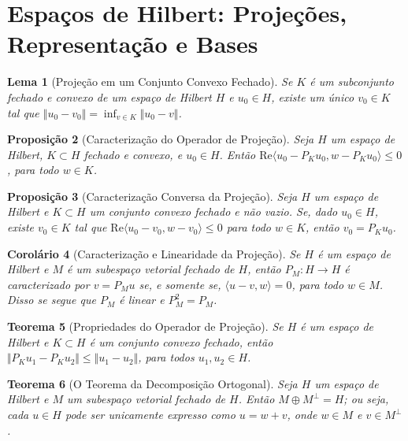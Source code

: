 \documentclass[12pt]{article}
\newtheorem{theorem}{Teorema}[section]
\newtheorem{proposition}[theorem]{Proposição}
\newtheorem{lemma}[theorem]{Lema}
\newtheorem{corollary}[theorem]{Corolário}
\begin{document}
\section{Espaços de Hilbert: Projeções, Representação e Bases}
\begin{multicols}{3}
\begin{lemma}[Projeção em um Conjunto Convexo Fechado]
Se $K$ é um subconjunto fechado e convexo de um espaço de Hilbert $H$ e $u_0 \in H$, existe um único $v_0 \in K$ tal que $\Vert u_0 - v_0 \Vert = \inf_{v \in K} \Vert u_0 - v \Vert$.
\end{lemma}

\begin{proposition}[Caracterização do Operador de Projeção]
Seja $H$ um espaço de Hilbert, $K \subset H$ fechado e convexo, e $u_0 \in H$. Então $\text{Re}\langle u_0 - P_K u_0, w - P_K u_0 \rangle \le 0$, para todo $w \in K$.
\end{proposition}

\begin{proposition}[Caracterização Conversa da Projeção]
Seja $H$ um espaço de Hilbert e $K \subset H$ um conjunto convexo fechado e não vazio. Se, dado $u_0 \in H$, existe $v_0 \in K$ tal que $\text{Re}\langle u_0 - v_0, w - v_0 \rangle \le 0$ para todo $w \in K$, então $v_0 = P_K u_0$.
\end{proposition}

\begin{corollary}[Caracterização e Linearidade da Projeção]
Se $H$ é um espaço de Hilbert e $M$ é um subespaço vetorial fechado de $H$, então $P_M: H \to H$ é caracterizado por $v = P_M u$ se, e somente se, $\langle u - v, w \rangle = 0$, para todo $w \in M$. Disso se segue que $P_M$ é linear e $P_M^2 = P_M$.
\end{corollary}

\begin{theorem}[Propriedades do Operador de Projeção]
Se $H$ é um espaço de Hilbert e $K \subset H$ é um conjunto convexo fechado, então $\Vert P_K u_1 - P_K u_2 \Vert \le \Vert u_1 - u_2 \Vert$, para todos $u_1, u_2 \in H$.
\end{theorem}

\begin{theorem}[O Teorema da Decomposição Ortogonal]
Seja $H$ um espaço de Hilbert e $M$ um subespaço vetorial fechado de $H$. Então $M \oplus M^\perp = H$; ou seja, cada $u \in H$ pode ser unicamente expresso como $u = w + v$, onde $w \in M$ e $v \in M^\perp$.
\end{theorem}


\end{multicols}
\end{document}
